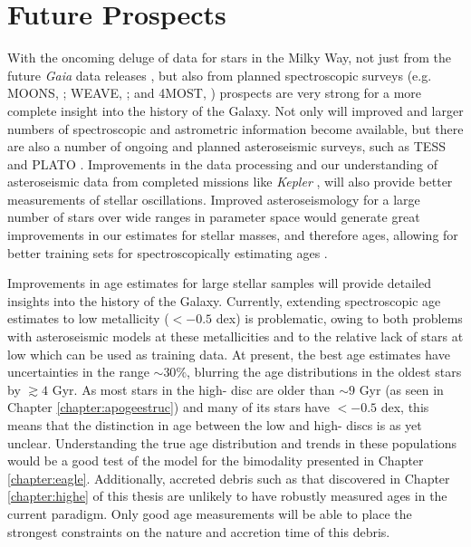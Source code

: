 \section{Future Prospects}
\label{sec:future}
With the oncoming deluge of data for stars in the Milky Way, not just from the future \emph{Gaia} data releases \citep[which will include epoch spectroscopy and photometry, offering the potential to mine the data for element abundances and ages, e.g.][]{2016A&A...595A...1G}, but also from planned spectroscopic surveys (e.g. MOONS, \citeauthor{2012SPIE.8446E..0SC} \citeyear{2012SPIE.8446E..0SC}; WEAVE, \citeauthor{2012SPIE.8446E..0PD} \citeyear{2012SPIE.8446E..0PD}; and 4MOST, \citeauthor{2016SPIE.9908E..1OD} \citeyear{2016SPIE.9908E..1OD}) prospects are very strong for a more complete insight into the history of the Galaxy. Not only will improved and larger numbers of spectroscopic and astrometric information become available, but there are also a number of ongoing and planned asteroseismic surveys, such as TESS \citep{2015JATIS...1a4003R} and PLATO \citep[e.g.][]{2017AN....338..644M}. Improvements in the data processing and our understanding of asteroseismic data from completed missions like \emph{Kepler} \citep{2010Sci...327..977B}, will also provide better measurements of stellar oscillations. Improved asteroseismology for a large number of stars over wide ranges in parameter space would generate great improvements in our estimates for stellar masses, and therefore ages, allowing for better training sets for spectroscopically estimating ages \citep[Such as those in Chapter \ref{chapter:apogeestruc}, from methods like that of e.g.][]{2016MNRAS.456.3655M}. 

Improvements in age estimates for large stellar samples will provide detailed insights into the history of the Galaxy. Currently, extending spectroscopic age estimates to low metallicity (\feh{}$< -0.5$ dex) is problematic, owing to both problems with asteroseismic models at these metallicities \citep[e.g.][]{2014ApJ...785L..28E} and to the relative lack of stars at low \feh{} which can be used as training data. At present, the best age estimates have uncertainties in the range $\sim 30\%$, blurring the age distributions in the oldest stars by $\gtrsim 4$ Gyr. As most stars in the high-\afe{} disc are older than $\sim 9$ Gyr (as seen in Chapter \ref{chapter:apogeestruc}) and many of its stars have \feh$< -0.5$ dex, this means that the distinction in age between the low and high-\afe{} discs is as yet unclear. Understanding the true age distribution and trends in these populations would be a good test of the model for the \afe{} bimodality presented in Chapter \ref{chapter:eagle}. Additionally, accreted debris such as that discovered in Chapter \ref{chapter:highe} of this thesis are unlikely to have robustly measured ages in the current paradigm. Only good age measurements will be able to place the strongest constraints on the nature and accretion time of this debris. 

